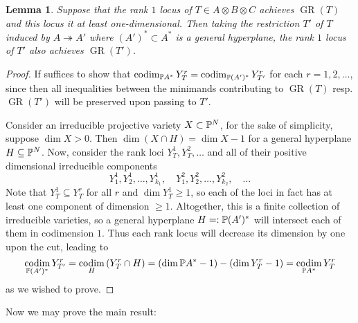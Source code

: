 \documentclass[a4paper,10pt]{article}
\def\zav#1{\left(#1\right)}
\let\surjto\twoheadrightarrow
\DeclareMathOperator{\codim}{codim}
\DeclareMathOperator{\GR}{GR}
\newtheorem{lemma}[theorem]{Lemma}
\theoremstyle{definition}
\newtheorem{definition}[theorem]{Definition}
\theoremstyle{remark}
\begin{document}

\begin{lemma}
    \label{lem:cuttingdown}
    Suppose that the rank $1$ locus of $T\in A\otimes B\otimes C$ achieves $\GR(T)$ and this locus it at least one-dimensional. Then taking the restriction $T'$ of $T$ induced by $A\surjto A'$ where $(A')^*\subset A^*$ is a general hyperplane, the rank $1$ locus of $T'$ also achieves $\GR(T')$.
\end{lemma}
\begin{proof}
    If suffices to show that $\codim_{\pe A^*}Y^r_{T} = \codim_{\pe (A')^*}Y^r_{T'}$ for each $r=1,2,\dots$, since then all inequalities between the minimands contributing to $\GR(T)$ resp. $\GR(T')$ will be preserved upon passing to $T'$.

    Consider an irreducible projective variety $X\subset\pe^N$, for the sake of simplicity, suppose $\dim X>0$. Then $\dim(X\cap H)=\dim X-1$ for a general hyperplane $H\subseteq \pe^N$. Now, consider the rank loci $Y^1_T,Y^2_T,\dots$ and all of their positive dimensional irreducible components
    \[
        Y^1_1,Y^1_2,\dots,Y^1_{k_1},\quad Y^2_1,Y^2_2,\dots,Y^2_{k_2},\quad \dots
    \]
    Note that $Y^1_T\subseteq Y^r_T$ for all $r$ and $\dim Y^1_T\geq1$, so each of the loci in fact has at least one component of dimension $\geq1$.
    Altogether, this is a finite collection of irreducible varieties, so a general hyperplane $H=:\pe(A')^*$ will intersect each of them in codimension $1$. Thus each rank locus will decrease its dimension by one upon the cut, leading to
    \[
        \codim_{\pe (A')^*}Y^r_{T'} = \codim_{H}\zav{Y^r_T\cap H} = (\dim\pe A^*-1) - \zav{\dim Y^r_T-1} = \codim_{\pe A^*}Y^r_T
    \]
    as we wished to prove.
\end{proof}


Now we may prove the main result:
\end{document}

